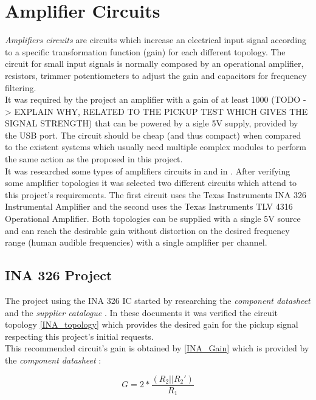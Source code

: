 \section{Amplifier Circuits}
\textit{Amplifiers circuits} \cite{amplifier-circuit} are circuits which increase
an electrical input signal according to a specific transformation function (gain)
for each different topology. The circuit for small input signals is normally
composed by an operational amplifier, resistors, trimmer potentiometers to adjust
the gain and capacitors for frequency filtering.\\
It was required by the project an amplifier with a gain of at least 1000 (TODO -> EXPLAIN WHY,
RELATED TO THE PICKUP TEST WHICH GIVES THE SIGNAL STRENGTH)
that can be powered by a sigle 5V supply, provided by the USB port. The circuit
should be cheap (and thus compact) when compared to the existent systems which usually need
multiple complex modules to perform the same action as the proposed in this project. \\
It was researched some types of amplifiers circuits in 
and in . After verifying some amplifier topologies it was
selected two different circuits which attend to this project's requirements.
The first circuit uses the Texas Instruments INA 326 Instrumental Amplifier and the
second uses the Texas Instruments TLV 4316 Operational Amplifier. Both topologies
can be supplied with a single 5V source and can reach the desirable gain without
distortion on the desired frequency range (human audible frequencies) with a single
amplifier per channel.\\

\subsection{INA 326 Project}
The project using the INA 326 IC started by researching the \textit{component datasheet}
\cite{INA326} and the \textit{supplier catalogue} \cite{OpAmps}. In these documents
it was verified the circuit topology \autoref{INA_topology} which provides the
desired gain for the pickup signal respecting this project's initial requests.\\
This recommended circuit's gain is obtained by \autoref{INA_Gain} which is
provided by the \textit{component datasheet} \cite{INA326}:

\begin{equation}
  \label{INA_Gain}
  G=2*\frac{(R_2||R_2 ')}{R_1}
\end{equation}

